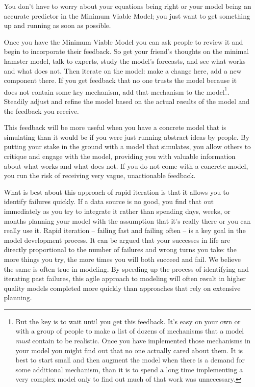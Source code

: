 \documentclass[]{memoir}
\begin{document}
You don't have to worry about your equations being right or your model
being an accurate predictor in the Minimum Viable Model; you just want
to get something up and running as soon as possible.

Once you have the Minimum Viable Model you can ask people to review it
and begin to incorporate their feedback. So get your friend's thoughts
on the minimal hamster model, talk to experts, study the model's
forecasts, and see what works and what does not. Then iterate on the
model: make a change here, add a new component there. If you get
feedback that no one trusts the model because it does not contain some
key mechanism, add that mechanism to the model\footnote{But the key is
  to wait until you get this feedback. It's easy on your own or with a
  group of people to make a list of dozens of mechanisms that a model
  \emph{must} contain to be realistic. Once you have implemented those
  mechanisms in your model you might find out that no one actually cared
  about them. It is best to start small and then augment the model when
  there is a demand for some additional mechanism, than it is to spend a
  long time implementing a very complex model only to find out much of
  that work was unnecessary.}. Steadily adjust and refine the model
based on the actual results of the model and the feedback you receive.

This feedback will be more useful when you have a concrete model that is
simulating than it would be if you were just running abstract ideas by
people. By putting your stake in the ground with a model that simulates,
you allow others to critique and engage with the model, providing you
with valuable information about what works and what does not. If you do
not come with a concrete model, you run the risk of receiving very
vague, unactionable feedback.

What is best about this approach of rapid iteration is that it allows
you to identify failures quickly. If a data source is no good, you find
that out immediately as you try to integrate it rather than spending
days, weeks, or months planning your model with the assumption that it's
really there or you can really use it. Rapid iteration -- failing fast
and failing often -- is a key goal in the model development process. It
can be argued that your successes in life are directly proportional to
the number of failures and wrong turns you take: the more things you
try, the more times you will both succeed and fail. We believe the same
is often true in modeling. By speeding up the process of identifying and
iterating past failures, this agile approach to modeling will often
result in higher quality models completed more quickly than approaches
that rely on extensive planning.
\end{document}
